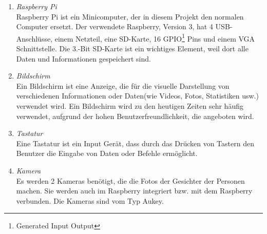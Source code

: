\begin{enumerate}
	\item \textit{Raspberry Pi} \\
	Raspberry Pi ist ein Minicomputer, der in diesem Projekt den normalen Computer ersetzt. Der verwendete Raspberry, Version 3, hat 4 USB-Anschlüsse, einem Netzteil, eine SD-Karte, 16 GPIO\footnote{Generated Input Output} Pins und einem VGA Schnittstelle. Die 3.-Bit SD-Karte ist ein wichtiges Element, weil dort alle Daten und Informationen gespeichert sind.
	\item \textit{Bildschirm} \\
	Ein Bildschirm ist eine Anzeige, die für die visuelle Darstellung von verschiedenen Informationen oder Daten(wie Videos, Fotos, Statistiken usw.) verwendet wird. Ein Bildschirm wird zu den heutigen Zeiten sehr häufig verwendet, aufgrund der hohen Benutzerfreundlichkeit, die angeboten wird.
	\item \textit{Tastatur} \\
	Eine Tastatur ist ein Input Gerät, dass durch das Drücken von Tastern den Benutzer die Eingabe von Daten oder Befehle ermöglicht.
	\item \textit{Kamera} \\
	Es werden 2 Kameras benötigt, die die Fotos der Gesichter der Personen machen. Sie werden auch im Raspberry integriert bzw. mit dem Raspberry verbunden. Die Kameras sind vom Typ Aukey.
\end{enumerate}
